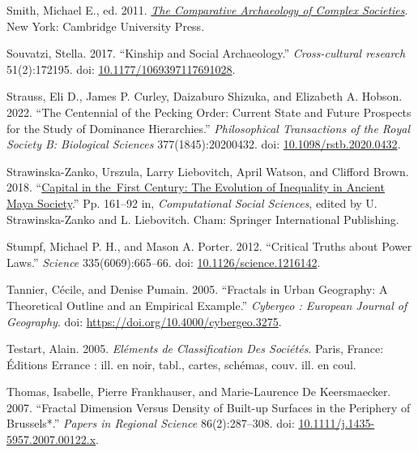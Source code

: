 \documentclass[
  12pt,
]{book}
\newlength{\cslhangindent}
\newlength{\cslentryspacingunit} %
\newenvironment{CSLReferences}[2] %
 {%
  \setlength{\parindent}{0pt}
  \ifodd #1
  \let\oldpar\par
  \def\par{\hangindent=\cslhangindent\oldpar}
  \fi
  \setlength{\parskip}{#2\cslentryspacingunit}
 }%
 {}
\begin{document}
\begin{CSLReferences}{1}{0}
\leavevmode{}%
Smith, Michael E., ed. 2011. \emph{\href{https://doi.org/10.1017/CBO9781139022712}{The Comparative Archaeology of Complex Societies}}. New York: Cambridge University Press.

\leavevmode{}%
Souvatzi, Stella. 2017. {``Kinship and Social Archaeology.''} \emph{Cross-cultural research} 51(2):172195. doi: \href{https://doi.org/10.1177/1069397117691028}{10.1177/1069397117691028}.

\leavevmode{}%
Strauss, Eli D., James P. Curley, Daizaburo Shizuka, and Elizabeth A. Hobson. 2022. {``The Centennial of the Pecking Order: Current State and Future Prospects for the Study of Dominance Hierarchies.''} \emph{Philosophical Transactions of the Royal Society B: Biological Sciences} 377(1845):20200432. doi: \href{https://doi.org/10.1098/rstb.2020.0432}{10.1098/rstb.2020.0432}.

\leavevmode{}%
Strawinska-Zanko, Urszula, Larry Liebovitch, April Watson, and Clifford Brown. 2018. {``\href{https://doi.org/10.1007/978-3-319-76765-9_9}{Capital in the~First Century: The Evolution of Inequality in Ancient Maya Society}.''} Pp. 161--92 in, \emph{Computational Social Sciences}, edited by U. Strawinska-Zanko and L. Liebovitch. Cham: Springer International Publishing.

\leavevmode{}%
Stumpf, Michael P. H., and Mason A. Porter. 2012. {``Critical Truths about Power Laws.''} \emph{Science} 335(6069):665--66. doi: \href{https://doi.org/10.1126/science.1216142}{10.1126/science.1216142}.

\leavevmode{}%
Tannier, Cécile, and Denise Pumain. 2005. {``Fractals in Urban Geography: A Theoretical Outline and an Empirical Example.''} \emph{Cybergeo : European Journal of Geography}. doi: \url{https://doi.org/10.4000/cybergeo.3275}.

\leavevmode{}%
Testart, Alain. 2005. \emph{Eléments de Classification Des Sociétés}. Paris, France: Éditions Errance : ill. en noir, tabl., cartes, schémas, couv. ill. en coul.

\leavevmode{}%
Thomas, Isabelle, Pierre Frankhauser, and Marie-Laurence De Keersmaecker. 2007. {``Fractal Dimension Versus Density of Built-up Surfaces in the Periphery of Brussels*.''} \emph{Papers in Regional Science} 86(2):287--308. doi: \href{https://doi.org/10.1111/j.1435-5957.2007.00122.x}{10.1111/j.1435-5957.2007.00122.x}.


\end{CSLReferences}
\end{document}

